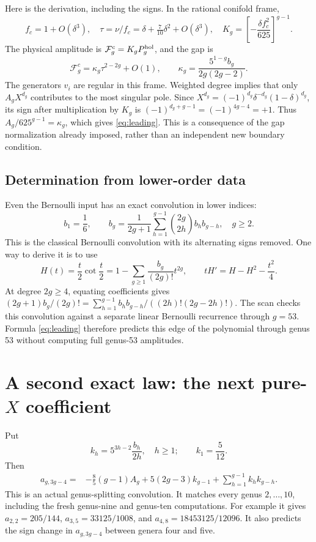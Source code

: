 \documentclass[11pt]{article}
\begin{document}
\begin{table}[ht]\centering

\caption{Highest pure-$X$ coefficient with the known power of five removed.
Every row agrees exactly with the independently computed physical polynomial.}
\label{tab:edge}
\end{table}

Here is the derivation, including the signs. In the rational conifold frame,
\[
 f_c=1+O(\delta^3),\quad
 \tau=\nu/f_c=\delta+\tfrac7{10}\delta^2+O(\delta^3),\quad
 K_g=\left[-\frac{\delta f_c^2}{625}\right]^{g-1}.
\]
The physical amplitude is $\mathcal F_g^c=K_gP_g^{\rm hol}$, and the gap is
\[
 \mathcal F_g^c=\kappa_g\tau^{2-2g}+O(1),\qquad
 \kappa_g=\frac{5^{1-g}b_g}{2g(2g-2)}.
\]
The generators $v_i$ are regular in this frame. Weighted degree implies that
only $A_gX^{d_g}$ contributes to the most singular pole.
Since $X^{d_g}=(-1)^{d_g}\delta^{-d_g}(1-\delta)^{d_g}$, its sign after
multiplication by $K_g$ is $(-1)^{d_g+g-1}=(-1)^{4g-4}=+1$.
Thus $A_g/625^{g-1}=\kappa_g$, which gives \eqref{eq:leading}.
This is a consequence of the gap normalization already imposed, rather than
an independent new boundary condition.

\subsection{Determination from lower-order data}
Even the Bernoulli input has an exact convolution in lower indices:
\begin{equation}\boxed{
 b_1=\frac16,\qquad
 b_g=\frac1{2g+1}\sum_{h=1}^{g-1}\binom{2g}{2h}b_hb_{g-h},\quad g\ge2.}
 \label{eq:bernoulli_rec}
\end{equation}
This is the classical Bernoulli convolution with its alternating signs removed.
One way to derive it is to use
\[
 H(t)=\frac t2\cot\frac t2
     =1-\sum_{g\ge1}\frac{b_g}{(2g)!}t^{2g},\qquad
 tH'=H-H^2-\frac{t^2}{4}.
\]
At degree $2g\ge4$, equating coefficients gives
$(2g+1)b_g/(2g)!=\sum_{h=1}^{g-1}b_hb_{g-h}/((2h)!(2g-2h)!)$.
The scan checks this convolution against a separate linear Bernoulli recurrence
through $g=53$. Formula \eqref{eq:leading} therefore predicts this edge of the
polynomial through genus 53 without computing full genus-53 amplitudes.

\section{A second exact law: the next pure-$X$ coefficient}
Put
\[
 k_h=5^{3h-2}\frac{b_h}{2h},\quad h\ge1;
 \qquad k_1=\frac5{12}.
\]
Then
\begin{equation}\boxed{\begin{aligned}
 a_{g,3g-4}={}&-\frac85(g-1)A_g
       +5(2g-3)k_{g-1}
       +\sum_{h=1}^{g-1}k_hk_{g-h}.
\end{aligned}}\label{eq:next}\end{equation}
This is an actual genus-splitting convolution. It matches every genus
$2,\ldots,10$, including the fresh genus-nine and genus-ten computations.
For example it gives $a_{2,2}=205/144$, $a_{3,5}=33125/1008$,
and $a_{4,8}=18453125/12096$.
It also predicts the sign change in $a_{g,3g-4}$ between genera four and five.
\end{document}

